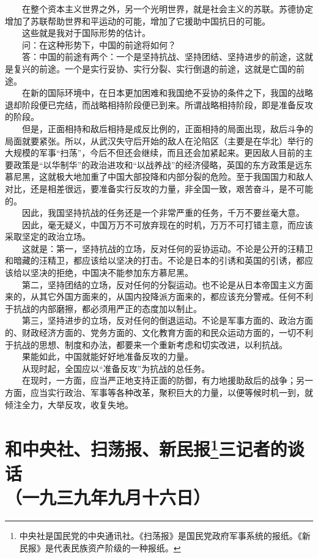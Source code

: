 \documentclass[cn,11pt,chinese]{elegantbook}
\def\myformat#1{\hfil\hfil #1}
\begin{document}
　　在整个资本主义世界之外，另一个光明世界，就是社会主义的苏联。苏德协定增加了苏联帮助世界和平运动的可能，增加了它援助中国抗日的可能。\\
　　这些就是我对于国际形势的估计。\\
　　问：在这种形势下，中国的前途将如何？\\
　　答：中国的前途有两个：一个是坚持抗战、坚持团结、坚持进步的前途，这就是复兴的前途。一个是实行妥协、实行分裂、实行倒退的前途，这就是亡国的前途。\\
　　在新的国际环境中，在日本更加困难和我国绝不妥协的条件之下，我国的战略退却阶段便已完结，而战略相持阶段便已到来。所谓战略相持阶段，即是准备反攻的阶段。\\
　　但是，正面相持和敌后相持是成反比例的，正面相持的局面出现，敌后斗争的局面就要紧张。所以，从武汉失守后开始的敌人在沦陷区（主要是在华北）举行的大规模的军事“扫荡”，今后不但还会继续，而且还会加紧起来。更因敌人目前的主要政策是“以华制华”的政治进攻和“以战养战”的经济侵略，英国的东方政策是远东慕尼黑，这就极大地加重了中国大部投降和内部分裂的危险。至于我国国力和敌人对比，还是相差很远，要准备实行反攻的力量，非全国一致，艰苦奋斗，是不可能的。\\
　　因此，我国坚持抗战的任务还是一个非常严重的任务，千万不要丝毫大意。\\
　　因此，毫无疑义，中国万万不可放弃现在的时机，万万不可打错主意，而应该采取坚定的政治立场。\\
　　这就是：第一，坚持抗战的立场，反对任何的妥协运动。不论是公开的汪精卫和暗藏的汪精卫，都应该给以坚决的打击。不论是日本的引诱和英国的引诱，都应该给以坚决的拒绝，中国决不能参加东方慕尼黑。\\
　　第二，坚持团结的立场，反对任何的分裂运动。也不论是从日本帝国主义方面来的，从其它外国方面来的，从国内投降派方面来的，都应该充分警戒。任何不利于抗战的内部磨擦，都必须用严正的态度加以制止。\\
　　第三，坚持进步的立场，反对任何的倒退运动。不论是军事方面的、政治方面的、财政经济方面的、党务方面的、文化教育方面的和民众运动方面的，一切不利于抗战的思想、制度和办法，都要来一个重新考虑和切实改进，以利抗战。\\
　　果能如此，中国就能好好地准备反攻的力量。\\
　　从现时起，全国应以“准备反攻”为抗战的总任务。\\
　　在现时，一方面，应当严正地支持正面的防御，有力地援助敌后的战争；另一方面，应当实行政治、军事等各种改革，聚积巨大的力量，以便等候时机一到，就倾注全力，大举反攻，收复失地。\\
\newpage\section*{\myformat{和中央社、扫荡报、新民报\footnote[1]{ 中央社是国民党的中央通讯社。《扫荡报》是国民党政府军事系统的报纸。《新民报》是代表民族资产阶级的一种报纸。}三记者的谈话}\\\myformat{（一九三九年九月十六日）}}
\end{document}

